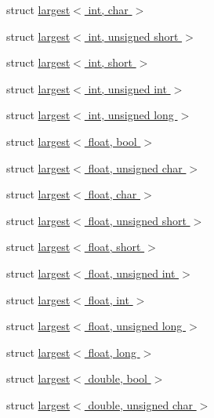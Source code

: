 \begin{DoxyCompactItemize}
\item 
struct \hyperlink{structcimg__library_1_1cimg_1_1largest_3_01int_00_01char_01_4}{largest$<$ int, char $>$}
\item 
struct \hyperlink{structcimg__library_1_1cimg_1_1largest_3_01int_00_01unsigned_01short_01_4}{largest$<$ int, unsigned short $>$}
\item 
struct \hyperlink{structcimg__library_1_1cimg_1_1largest_3_01int_00_01short_01_4}{largest$<$ int, short $>$}
\item 
struct \hyperlink{structcimg__library_1_1cimg_1_1largest_3_01int_00_01unsigned_01int_01_4}{largest$<$ int, unsigned int $>$}
\item 
struct \hyperlink{structcimg__library_1_1cimg_1_1largest_3_01int_00_01unsigned_01long_01_4}{largest$<$ int, unsigned long $>$}
\item 
struct \hyperlink{structcimg__library_1_1cimg_1_1largest_3_01float_00_01bool_01_4}{largest$<$ float, bool $>$}
\item 
struct \hyperlink{structcimg__library_1_1cimg_1_1largest_3_01float_00_01unsigned_01char_01_4}{largest$<$ float, unsigned char $>$}
\item 
struct \hyperlink{structcimg__library_1_1cimg_1_1largest_3_01float_00_01char_01_4}{largest$<$ float, char $>$}
\item 
struct \hyperlink{structcimg__library_1_1cimg_1_1largest_3_01float_00_01unsigned_01short_01_4}{largest$<$ float, unsigned short $>$}
\item 
struct \hyperlink{structcimg__library_1_1cimg_1_1largest_3_01float_00_01short_01_4}{largest$<$ float, short $>$}
\item 
struct \hyperlink{structcimg__library_1_1cimg_1_1largest_3_01float_00_01unsigned_01int_01_4}{largest$<$ float, unsigned int $>$}
\item 
struct \hyperlink{structcimg__library_1_1cimg_1_1largest_3_01float_00_01int_01_4}{largest$<$ float, int $>$}
\item 
struct \hyperlink{structcimg__library_1_1cimg_1_1largest_3_01float_00_01unsigned_01long_01_4}{largest$<$ float, unsigned long $>$}
\item 
struct \hyperlink{structcimg__library_1_1cimg_1_1largest_3_01float_00_01long_01_4}{largest$<$ float, long $>$}
\item 
struct \hyperlink{structcimg__library_1_1cimg_1_1largest_3_01double_00_01bool_01_4}{largest$<$ double, bool $>$}
\item 
struct \hyperlink{structcimg__library_1_1cimg_1_1largest_3_01double_00_01unsigned_01char_01_4}{largest$<$ double, unsigned char $>$}

\end{DoxyCompactItemize}
